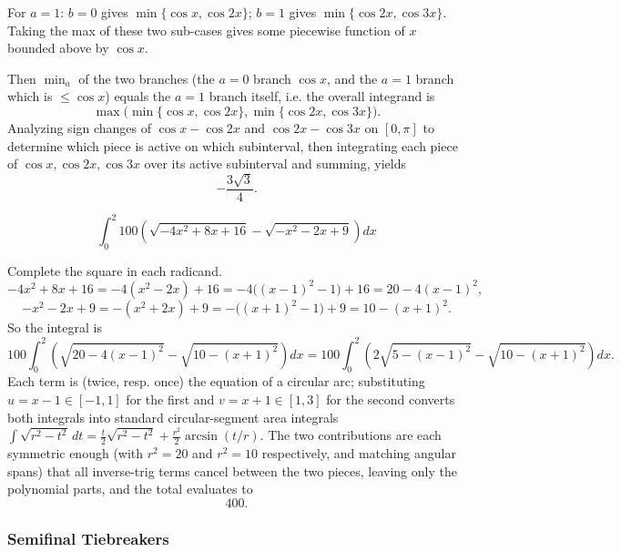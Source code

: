 \begin{questions}
\begin{solution}
For $a=1$: $b=0$ gives $\min\{\cos x,\cos2x\}$; $b=1$ gives $\min\{\cos2x,\cos3x\}$. Taking the max of these two sub-cases gives some piecewise function of $x$ bounded above by $\cos x$.

Then $\min_a$ of the two branches (the $a=0$ branch $\cos x$, and the $a=1$ branch which is $\le \cos x$) equals the $a=1$ branch itself, i.e. the overall integrand is
\[
\max\big(\min\{\cos x,\cos2x\},\min\{\cos2x,\cos3x\}\big).
\]
Analyzing sign changes of $\cos x-\cos2x$ and $\cos2x-\cos3x$ on $[0,\pi]$ to determine which piece is active on which subinterval, then integrating each piece of $\cos x,\cos2x,\cos3x$ over its active subinterval and summing, yields
\[
-\frac{3\sqrt3}{4}.
\]
\end{solution}

\question
\[
\int_0^{2} 100\left(\sqrt{-4x^{2}+8x+16}-\sqrt{-x^{2}-2x+9}\right)dx
\]
\begin{solution}
Complete the square in each radicand.
\[
-4x^2+8x+16=-4(x^2-2x)+16=-4\big((x-1)^2-1\big)+16=20-4(x-1)^2,
\]
\[
-x^2-2x+9=-(x^2+2x)+9=-\big((x+1)^2-1\big)+9=10-(x+1)^2.
\]
So the integral is
\[
100\int_0^2\left(\sqrt{20-4(x-1)^2}-\sqrt{10-(x+1)^2}\right)dx=100\int_0^2\left(2\sqrt{5-(x-1)^2}-\sqrt{10-(x+1)^2}\right)dx.
\]
Each term is (twice, resp. once) the equation of a circular arc; substituting $u=x-1\in[-1,1]$ for the first and $v=x+1\in[1,3]$ for the second converts both integrals into standard circular-segment area integrals $\int\sqrt{r^2-t^2}\,dt=\tfrac{t}{2}\sqrt{r^2-t^2}+\tfrac{r^2}{2}\arcsin(t/r)$. The two contributions are each symmetric enough (with $r^2=20$ and $r^2=10$ respectively, and matching angular spans) that all inverse-trig terms cancel between the two pieces, leaving only the polynomial parts, and the total evaluates to
\[
400.
\]
\end{solution}

\end{questions}

\subsubsection*{Semifinal Tiebreakers}

